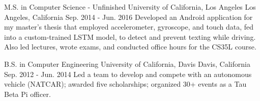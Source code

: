 

\begin{cventries}

  \cventry
    {M.S. in Computer Science - Unfinished} %
    {University of California, Los Angeles} %
    {Los Angeles, California} %
    {Sep. 2014 - Jun. 2016} %
    {Developed an Android application for my master's thesis that employed accelerometer, gyroscope, and touch data, fed into a custom-trained LSTM model, to detect and prevent texting while driving. Also led lectures, wrote exams, and conducted office hours for the CS35L course.} %
    {}

  \cventry
    {B.S. in Computer Engineering} %
    {University of California, Davis} %
    {Davis, California} %
    {Sep. 2012 - Jun. 2014} %
    {Led a team to develop and compete with an autonomous vehicle (NATCAR); awarded five scholarships; organized 30+ events as a Tau Beta Pi officer.}
    {}

\end{cventries}
